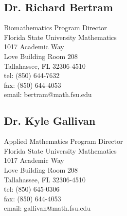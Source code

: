 \documentclass[11pt]{cv}
\begin{document}
\subsection*{Dr. Richard Bertram}
\label{sec:org3445bda}
Biomathematics Program Director\\
Florida State University Mathematics\\
1017 Academic Way\\
Love Building Room 208\\
Tallahassee, FL 32306-4510\\
tel: (850) 644-7632\\
fax: (850) 644-4053\\
email: bertram@math.fsu.edu\\
\subsection*{Dr. Kyle Gallivan}
\label{sec:org977c013}
Applied Mathematics Program Director\\
Florida State University Mathematics\\
1017 Academic Way\\
Love Building Room 208\\
Tallahassee, FL 32306-4510\\
tel: (850) 645-0306\\
fax: (850) 644-4053\\
email: gallivan@math.fsu.edu\\
\end{document}
